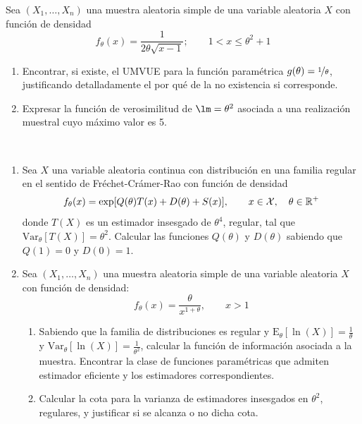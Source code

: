 \documentclass[12pt]{article}
\newcommand{\E}{\mathrm{E}}
\newcommand{\V}{\mathrm{Var}}
\begin{document}
    \begin{ejercicio}\label{ej:2}
        Sea $(X_1,\ldots,X_n)$ una muestra aleatoria simple de una variable aleatoria $X$ con función de densidad
        \begin{equation*}
            f_\theta(x) = \frac{1}{2\theta\sqrt{x-1}}; \qquad 1<x\leq \theta^2+1
        \end{equation*}
        \begin{enumerate}[label=\alph*)]
            \item Encontrar, si existe, el UMVUE para la función paramétrica $g(\theta) = \nicefrac{1}{\theta}$, justificando detalladamente el por qué de la no existencia si corresponde.
            \item Expresar la función de verosimilitud de $\lm = \theta^2$ asociada a una realización muestral cuyo máximo valor es 5.
        \end{enumerate}
    \end{ejercicio}

    \begin{ejercicio}
        \ \\
        \begin{enumerate}[label=\alph*)]
            \item Sea $X$ una variable aleatoria continua con distribución en una familia regular en el sentido de Fréchet-Crámer-Rao con función de densidad
                \begin{equation*}
                    f_\theta(x) = \exp[Q(\theta) T(x) + D(\theta) + S(x)], \qquad x\in \mathcal{X}, \quad \theta\in \mathbb{R}^+
                \end{equation*}
                donde $T(X)$ es un estimador insesgado de $\theta^4$, regular, tal que $\V_\theta[T(X)] = \theta^2$. Calcular las funciones $Q(\theta)$ y $D(\theta)$ sabiendo que $Q(1) = 0$ y $D(0) = 1$.
            \item Sea $(X_1,\ldots,X_n)$ una muestra aleatoria simple de una variable aleatoria $X$ con función de densidad:
                \begin{equation*}
                    f_\theta(x) = \frac{\theta}{x^{1+\theta}}, \qquad x>1
                \end{equation*}
                \begin{enumerate}[label=\alph*)]
                    \item Sabiendo que la familia de distribuciones es regular y $\E_\theta[\ln(X)] = \frac{1}{\theta}$ y $\V_\theta[\ln(X)] = \frac{1}{\theta^2}$, calcular la función de información asociada a la muestra. Encontrar la clase de funciones paramétricas que admiten estimador eficiente y los estimadores correspondientes.
                    \item Calcular la cota para la varianza de estimadores insesgados en $\theta^2$, regulares, y justificar si se alcanza o no dicha cota.
                \end{enumerate}
        \end{enumerate}
    \end{ejercicio}
\end{document}
